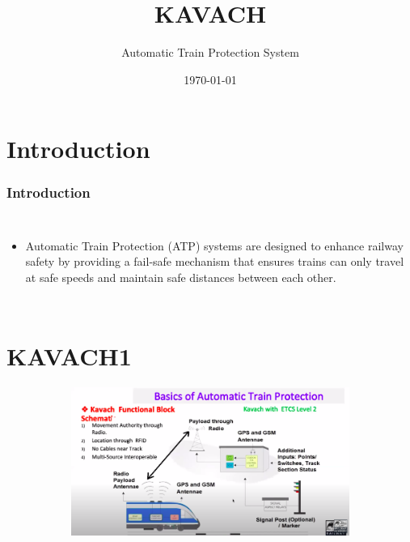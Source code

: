\documentclass{beamer}
\title{KAVACH}
\author{Automatic Train Protection System}
\institute{Indian Institute of Technology, Hyderabad.}
\date{\today}
\begin{document}
\begin{frame}
\titlepage
\end{frame}
\section{Introduction}
\begin{frame}
\frametitle{Introduction}
\begin{columns}
  \begin{itemize}
  \item Automatic Train Protection (ATP) systems are designed to enhance railway safety by providing a fail-safe mechanism that ensures trains can only travel at safe speeds and maintain safe distances between each other.
  \end{itemize}
\end{columns}

\end{frame}


\section{KAVACH1}
\begin{frame}

\begin{figure}[h!]
  \centering
  \begin{subfigure}[b]{1\linewidth}
    \includegraphics[width=\linewidth]{./figs/TCAS1.png}
  \end{subfigure}

\end{figure}

\end{frame}
\end{document}
